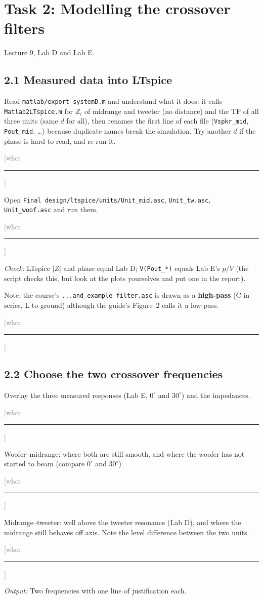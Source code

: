 \documentclass[a4paper,10pt]{article}
\newcommand{\file}[1]{\nolinkurl{#1}}
\newcommand{\cmd}[1]{\texttt{#1}}   %
\newcommand{\who}{\textcolor{gray}{[who: \rule{1.6cm}{0.4pt}]}}
\newcommand{\out}[1]{\par\hspace*{1.2em}\textit{Output:} #1}
\newcommand{\chk}[1]{\par\hspace*{1.2em}\textit{Check:} #1}
\begin{document}
\section*{Task 2: Modelling the crossover filters}
Lecture 9, Lab D and Lab E.

\subsection*{2.1 Measured data into LTspice}
\begin{todo}
\item Read \file{matlab/export_systemD.m} and understand what it does: it calls
  \file{Matlab2LTspice.m} for $Z_i$ of midrange and tweeter (no distance) and the TF of all three
  units (same $d$ for all), then renames the first line of each file (\file{Vspkr_mid},
  \file{Pout_mid}, \dots) because duplicate names break the simulation. Try another $d$ if the
  phase is hard to read, and re-run it. \who
\item Open \cmd{Final design/ltspice/units/Unit\_mid.asc}, \file{Unit_tw.asc}, \file{Unit_woof.asc} and run
  them. \who
  \chk{LTspice $|Z|$ and phase equal Lab D; \file{V(Pout_*)} equals Lab E's $p/V$ (the script
  checks this, but look at the plots yourselves and put one in the report).}
\item Note: the course's \file{...and example filter.asc} is drawn as a \textbf{high-pass}
  (C in series, L to ground) although the guide's Figure~2 calls it a low-pass. \who
\end{todo}

\subsection*{2.2 Choose the two crossover frequencies}
\begin{todo}
\item Overlay the three measured responses (Lab E, $0^\circ$ and $30^\circ$) and the impedances. \who
\item Woofer--midrange: where both are still smooth, and where the woofer has not started to
  beam (compare $0^\circ$ and $30^\circ$). \who
\item Midrange--tweeter: well above the tweeter resonance (Lab D), and where the midrange still
  behaves off axis. Note the level difference between the two units. \who
  \out{Two frequencies with one line of justification each.}
\end{todo}
\end{document}
